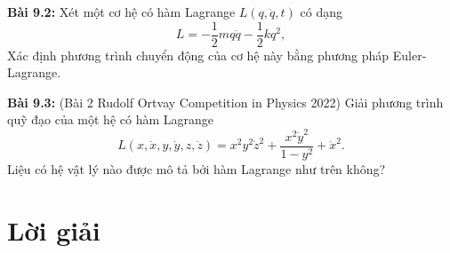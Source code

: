 \textbf{Bài 9.2:} Xét một cơ hệ có hàm Lagrange \(L ( q, \ddot{q}, t)\) có dạng
\begin{equation}
    L = -\dfrac{1}{2} m q \ddot{q} - \dfrac{1}{2} k q^2,
\end{equation}
Xác định phương trình chuyển động của cơ hệ này bằng phương pháp Euler-Lagrange.

\textbf{Bài 9.3:} (Bài 2 Rudolf Ortvay Competition in Physics 2022) Giải phương trình quỹ đạo của một hệ có hàm Lagrange
\begin{equation}
    L (x, \dot{x}, y, \dot{y}, z, \dot{z}) = x^2 y^2 \dot{z}^2 + \dfrac{x^2 \dot{y}^2}{1-y^2} + \dot{x}^2.
\end{equation}
Liệu có hệ vật lý nào được mô tả bởi hàm Lagrange như trên không?

\section{Lời giải}


\begin{refsection}
\nocite{cline2017variational,morin2008introduction,kompaneyets2013theoretical}
\printbibliography
\end{refsection}